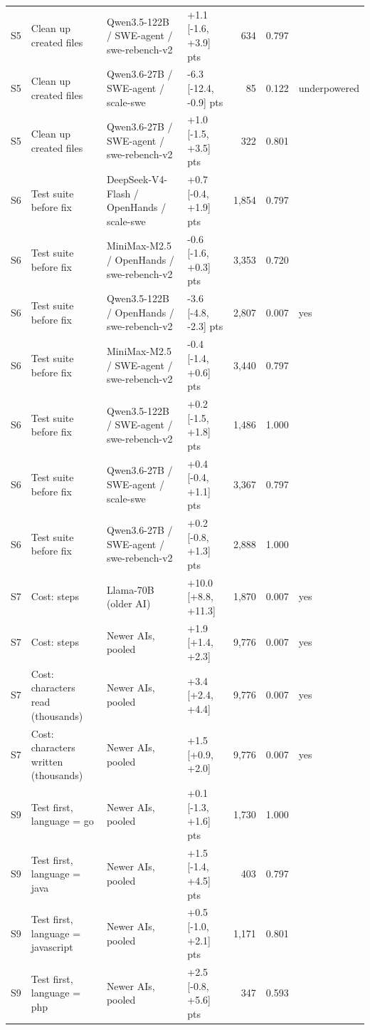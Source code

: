 \begin{tabular}{llllrrl}
S5 & Clean up created files & Qwen3.5-122B / SWE-agent / swe-rebench-v2 & +1.1 [-1.6, +3.9] pts & 634 & 0.797 &  \\
S5 & Clean up created files & Qwen3.6-27B / SWE-agent / scale-swe & -6.3 [-12.4, -0.9] pts & 85 & 0.122 & underpowered \\
S5 & Clean up created files & Qwen3.6-27B / SWE-agent / swe-rebench-v2 & +1.0 [-1.5, +3.5] pts & 322 & 0.801 &  \\
S6 & Test suite before fix & DeepSeek-V4-Flash / OpenHands / scale-swe & +0.7 [-0.4, +1.9] pts & 1,854 & 0.797 &  \\
S6 & Test suite before fix & MiniMax-M2.5 / OpenHands / swe-rebench-v2 & -0.6 [-1.6, +0.3] pts & 3,353 & 0.720 &  \\
S6 & Test suite before fix & Qwen3.5-122B / OpenHands / swe-rebench-v2 & -3.6 [-4.8, -2.3] pts & 2,807 & 0.007 & yes \\
S6 & Test suite before fix & MiniMax-M2.5 / SWE-agent / swe-rebench-v2 & -0.4 [-1.4, +0.6] pts & 3,440 & 0.797 &  \\
S6 & Test suite before fix & Qwen3.5-122B / SWE-agent / swe-rebench-v2 & +0.2 [-1.5, +1.8] pts & 1,486 & 1.000 &  \\
S6 & Test suite before fix & Qwen3.6-27B / SWE-agent / scale-swe & +0.4 [-0.4, +1.1] pts & 3,367 & 0.797 &  \\
S6 & Test suite before fix & Qwen3.6-27B / SWE-agent / swe-rebench-v2 & +0.2 [-0.8, +1.3] pts & 2,888 & 1.000 &  \\
S7 & Cost: steps & Llama-70B (older AI) & +10.0 [+8.8, +11.3] & 1,870 & 0.007 & yes \\
S7 & Cost: steps & Newer AIs, pooled & +1.9 [+1.4, +2.3] & 9,776 & 0.007 & yes \\
S7 & Cost: characters read (thousands) & Newer AIs, pooled & +3.4 [+2.4, +4.4] & 9,776 & 0.007 & yes \\
S7 & Cost: characters written (thousands) & Newer AIs, pooled & +1.5 [+0.9, +2.0] & 9,776 & 0.007 & yes \\
S9 & Test first, language = go & Newer AIs, pooled & +0.1 [-1.3, +1.6] pts & 1,730 & 1.000 &  \\
S9 & Test first, language = java & Newer AIs, pooled & +1.5 [-1.4, +4.5] pts & 403 & 0.797 &  \\
S9 & Test first, language = javascript & Newer AIs, pooled & +0.5 [-1.0, +2.1] pts & 1,171 & 0.801 &  \\
S9 & Test first, language = php & Newer AIs, pooled & +2.5 [-0.8, +5.6] pts & 347 & 0.593 &  \\

\end{tabular}
